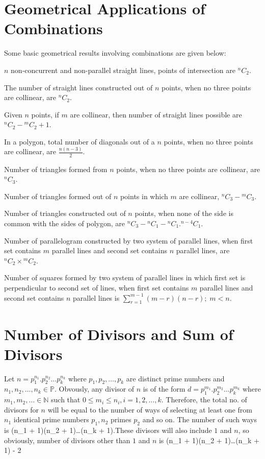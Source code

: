\section{Geometrical Applications of Combinations}
Some basic geometrical results involving combinations are given below:
\startitemize[n]
\item $n$ non-concurrent and non-parallel straight lines, points of intersection are ${}^nC_2$.
\item The number of straight lines constructed out of $n$ points, when no three points are collinear, are ${}^nC_2$.
\item Given $n$ points, if $m$ are collinear, then number of straight lines possible are ${}^nC_2 - {}^mC_2 + 1$.
\item In a polygon, total number of diagonals out of a $n$ points, when no three points are collinear, are $\frac{n(n - 3)}{2}$.
\item Number of triangles formed from $n$ points, when no three points are collinear, are ${}^nC_3$.
\item Number of triangles formed out of $n$ points in which $m$ are collinear, ${}^nC_3 - {}^mC_3$.
\item Number of triangles constructed out of $n$ points, when none of the side is common with the sides of polygon, are ${}^nC_3 -
  {}^nC_1 - {}^nC_1.{}^{n - 4}C_1$.
\item Number of parallelogram constructed by two system of parallel lines, when first set contains $m$ parallel lines and second
  set contains $n$ parallel lines, are ${}^nC_2\times{}^mC_2$.
\item Number of squares formed by two system of parallel lines in which first set is perpendicular to second set of lines, when
  first set contains $m$ parallel lines and second set contains $n$ parallel lines is $\displaystyle\sum_{r=1}^{m - 1}(m - r)(n -
  r);\;m<n$.
\stopitemize

\section{Number of Divisors and Sum of Divisors}
Let $n = p_1^{n_1}.p_2^{n_2}\ldots p_k^{n_k}$ where $p_1, p_2, \ldots, p_k$ are distinct prime numbers and $n_1, n_2, \ldots,
n_k\in \mathbb{P}$. Obvously, any divisor of $n$ is of the form $d = p_1^{m_1}.p_2^{m_2}\ldots p_k^{m_k}$ where $m_1, m_2,
\ldots\in\mathbb{N}$ such that $0\leq m_i\leq n_i, i = 1, 2, \ldots, k$. Therefore, the total no. of divisors for $n$ will be equal
to the number of ways of selecting at least one from $n_1$ identical prime numbers $p_1, n_2$ primes $p_2$ and so on. The number of
such ways is \startformula (n_1 + 1)(n_2 + 1)\ldots(n_k + 1).\stopformula These divisors will also include $1$ and $n$, so obviously, number of divisors
other than $1$ and $n$ is \startformula (n_1 + 1)(n_2 + 1)\ldots(n_k + 1) - 2\stopformula

